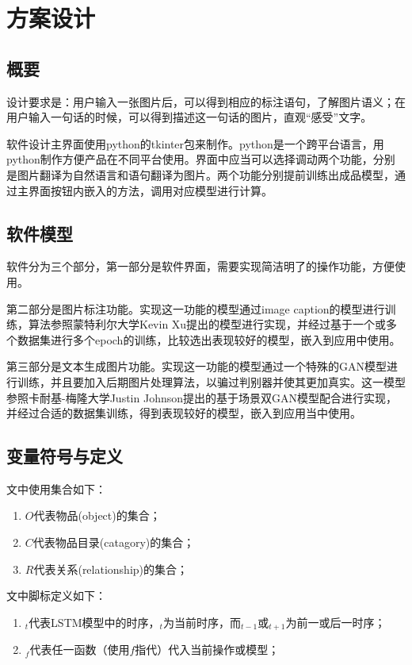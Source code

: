 
\chapter{方案设计}

\section{概要}
设计要求是：用户输入一张图片后，可以得到相应的标注语句，了解图片语义；在用户输入一句话的时候，可以得到描述这一句话的图片，直观“感受”文字。

软件设计主界面使用python的tkinter包来制作。python是一个跨平台语言，用python制作方便产品在不同平台使用。界面中应当可以选择调动两个功能，分别是图片翻译为自然语言和语句翻译为图片。两个功能分别提前训练出成品模型，通过主界面按钮内嵌入的方法，调用对应模型进行计算。

\section{软件模型}
软件分为三个部分，第一部分是软件界面，需要实现简洁明了的操作功能，方便使用。

第二部分是图片标注功能。实现这一功能的模型通过image caption的模型进行训练，算法参照蒙特利尔大学Kevin Xu提出的模型进行实现，并经过基于一个或多个数据集进行多个epoch的训练，比较选出表现较好的模型，嵌入到应用中使用。

第三部分是文本生成图片功能。实现这一功能的模型通过一个特殊的GAN模型进行训练，并且要加入后期图片处理算法，以骗过判别器并使其更加真实。这一模型参照卡耐基-梅隆大学Justin Johnson提出的基于场景双GAN模型配合进行实现，并经过合适的数据集训练，得到表现较好的模型，嵌入到应用当中使用。

\section{变量符号与定义}
文中使用集合如下：
\begin{enumerate}[fullwidth,itemindent=2em,label=\arabic*.]
    \item $O$代表物品(object)的集合；
    \item $C$代表物品目录(catagory)的集合；
    \item $R$代表关系(relationship)的集合；
\end{enumerate}

文中脚标定义如下：
\begin{enumerate}[fullwidth,itemindent=2em,label=\arabic*.]
    \item ${}_t$代表LSTM模型中的时序，${}_t$为当前时序，而${}_{t-1}$或${}_{t+1}$为前一或后一时序；
    \item $_f$代表任一函数（使用$f$指代）代入当前操作或模型；
\end{enumerate}

